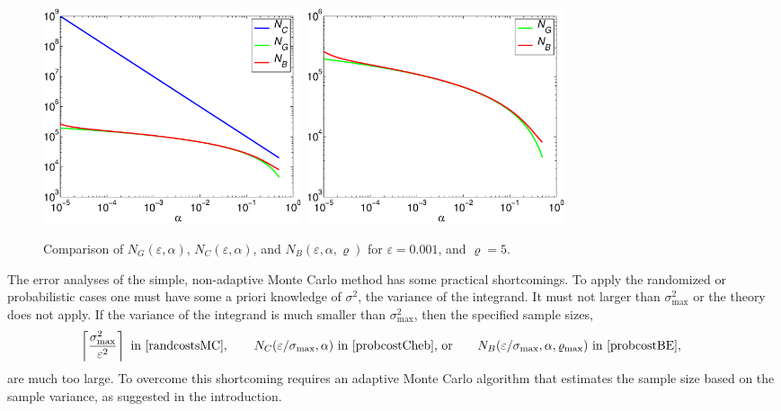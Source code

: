 \documentclass[12pt]{amsart}
\begin{document}
\begin{figure}
\centering
\includegraphics[width=3in]{alphacompare.eps} \quad \includegraphics[width=3in]{alphacompareb.eps} \quad 
\caption{Comparison of $ N_G(\varepsilon,\alpha)$, $N_C(\varepsilon,\alpha)$, and $N_B(\varepsilon,\alpha,\varrho)$ for $\varepsilon = 0.001$, and $\varrho=5$. \label{alphacomparefig}}
\end{figure}

The error analyses of the simple, non-adaptive Monte Carlo method has some practical shortcomings.  To apply the randomized or probabilistic cases one must have some a priori knowledge of $\sigma^2$, the variance of the integrand.  It must not larger than $\sigma^2_{\max}$ or the theory does not apply.  If the variance of the integrand is much smaller than $\sigma^2_{\max}$, then the specified sample sizes, 
\[
\left\lceil \frac{\sigma^2_{\max}} {\varepsilon^2} \right \rceil \text{ in  \eqref{randcostsMC}}, \qquad N_{C}(\varepsilon/\sigma_{\max},\alpha) \text{ in  \eqref{probcostCheb}, or} \qquad  N_{B}(\varepsilon/\sigma_{\max},\alpha,\varrho_{\max}) \text{ in  \eqref{probcostBE}}, \qquad
\]
are much too large.  To overcome this shortcoming requires an adaptive Monte Carlo algorithm that estimates the sample size based on the sample variance, as suggested in the introduction.
\end{document}
